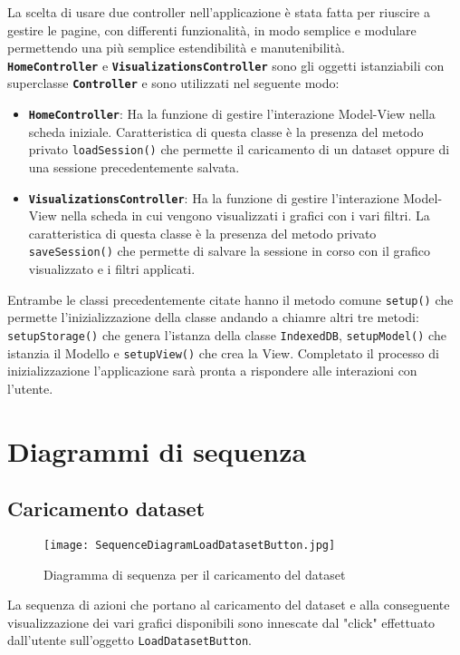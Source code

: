 La scelta di usare due controller nell'applicazione è stata fatta per riuscire a gestire le pagine, con differenti funzionalità, in modo semplice e modulare permettendo una più semplice estendibilità e manutenibilità.\\
\textbf{\texttt{HomeController}} e \textbf{\texttt{VisualizationsController}} sono gli oggetti istanziabili con superclasse \textbf{\texttt{Controller}} e sono utilizzati nel seguente modo:
\begin{itemize}
	\item \textbf{\texttt{HomeController}}: Ha la funzione di gestire l'interazione Model-View nella scheda iniziale. Caratteristica di questa classe è la presenza del metodo privato \texttt{loadSession()} che permette il caricamento di un dataset oppure di una sessione precedentemente salvata.
	\item \textbf{\texttt{VisualizationsController}}: Ha la funzione di gestire l'interazione Model-View nella scheda in cui vengono visualizzati i grafici con i vari filtri. La caratteristica di questa classe è la presenza del metodo privato \texttt{saveSession()} che permette di salvare la sessione in corso con il grafico visualizzato e i filtri applicati.
\end{itemize}
Entrambe le classi precedentemente citate hanno il metodo comune \texttt{setup()} che permette l'inizializzazione della classe andando a chiamre altri tre metodi: \texttt{setupStorage()} che genera l'istanza della classe \texttt{IndexedDB}, \texttt{setupModel()} che istanzia il Modello e \texttt{setupView()} che crea la View. Completato il processo di inizializzazione l'applicazione sarà pronta a rispondere alle interazioni con l'utente.

\section{Diagrammi di sequenza}
\subsection{Caricamento dataset}
\begin{figure}[H]
	\centering
	\texttt{[image: SequenceDiagramLoadDatasetButton.jpg]}
	\caption{Diagramma di sequenza per il caricamento del dataset}
  \end{figure}
  La sequenza di azioni che portano al caricamento del dataset e alla conseguente visualizzazione dei vari grafici disponibili sono innescate dal "click" effettuato dall'utente sull'oggetto \texttt{LoadDatasetButton}.

